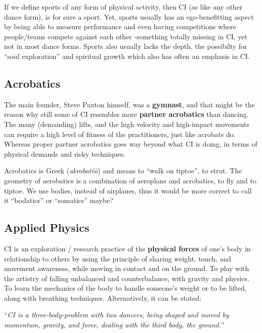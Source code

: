 If we define sports of any form of physical activity, then CI (as like any other dance form), is for sure a sport.
Yet, sports usually has an ego-benefitting aspect by being able to measure performance and even having competitions where people/teams compete against each other -something totally missing in CI, yet not in most dance forms.
Sports also usually lacks the depth, the possibilty for ``soul exploration'' and spiritual growth which also has often an emphasis in CI.

\subsection{Acrobatics}\label{subsec:acrobatics}

The main founder, Steve Paxton himself, was a \textbf{gymnast}, and that might be the reason why still some of CI resembles more \textbf{partner acrobatics} than dancing.
The many (demanding) lifts, and the high velocity and high-impact movements can require a high level of fitness of the practitioners, just like acrobats do.
Whereas proper partner acrobatics goes way beyond what CI is doing, in terms of physical demands and risky techniques.

Acrobatics is Greek (\textit{akrobatéō}) and means to ``walk on tiptoe'', to strut.
The geometry of aerobatics is a combination of aeroplane and acrobatics, to fly and to tiptoe.
We use bodies, instead of airplanes, thus it would be more correct to call it ``bodatics'' or ``somatics'' maybe?

\subsection{Applied Physics}\label{subsec:applied-physics}

CI is an exploration / research practice of the \textbf{physical forces} of one's body in relationship to others by using the principle of sharing weight, touch, and movement awareness, while moving in contact and on the ground.
To play with the artistry of falling unbalanced and counterbalance, with gravity and physics.
To learn the mechanics of the body to handle someone's weight or to be lifted, along with breathing techniques.
Alternatively, it can be stated:

\begin{center}
	``\textit{CI is a three-body-problem with two dancers, being shaped and moved by momentum, gravity, and force, dealing with the third body, the ground.}''
\end{center}


